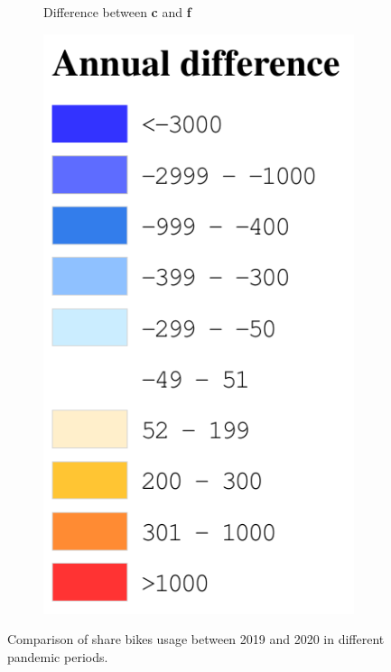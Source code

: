 \documentclass[ijgi,submit,moreauthors,pdftex]{Definitions/mdpi}
\begin{document}
\begin{figure}[!ht]
\begin{subfigure}{.28\textwidth}
\begin{tikzpicture}[inner sep = 0pt]
        \end{tikzpicture}
        \caption{Difference between \textbf{c} and \textbf{f}}
        \label{fig:p_c_dif}
    \end{subfigure}
    \begin{subfigure}{.14\textwidth}
        \includegraphics[width=\textwidth]{Figures/AnnualDifLegend-eps-converted-to.pdf}
    \end{subfigure}
    \caption{Comparison of share bikes usage between 2019 and 2020 in different pandemic periods.}
    \label{fig:compare_2019_and_2020}
\end{figure}
\end{document}
